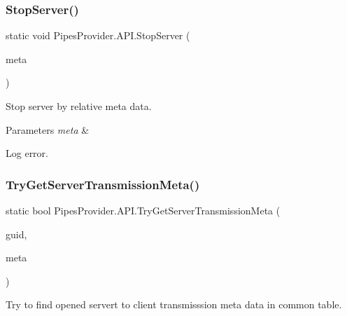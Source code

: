\subsubsection{\texorpdfstring{Stop\+Server()}{StopServer()}\hspace{0.1cm}{\footnotesize\ttfamily [2/2]}}
{\footnotesize\ttfamily static void Pipes\+Provider.\+A\+P\+I.\+Stop\+Server (\begin{DoxyParamCaption}\item[{\mbox{\hyperlink{class_pipes_provider_1_1_server_transmission_meta}{Server\+Transmission\+Meta}}}]{meta }\end{DoxyParamCaption})\hspace{0.3cm}{\ttfamily [static]}}



Stop server by relative meta data. 


\begin{DoxyParams}{Parameters}
{\em meta} & \\
\hline
\end{DoxyParams}
Log error. \mbox{\label{class_pipes_provider_1_1_a_p_i_a5eb987a8a4edfb2b26d861071aca70a2}} 
\subsubsection{\texorpdfstring{Try\+Get\+Server\+Transmission\+Meta()}{TryGetServerTransmissionMeta()}}
{\footnotesize\ttfamily static bool Pipes\+Provider.\+A\+P\+I.\+Try\+Get\+Server\+Transmission\+Meta (\begin{DoxyParamCaption}\item[{string}]{guid,  }\item[{out \mbox{\hyperlink{class_pipes_provider_1_1_server_transmission_meta}{Server\+Transmission\+Meta}}}]{meta }\end{DoxyParamCaption})\hspace{0.3cm}{\ttfamily [static]}}



Try to find opened servert to client transmisssion meta data in common table. 


